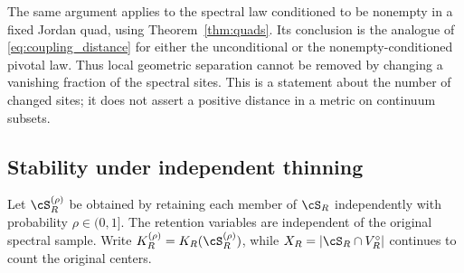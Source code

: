 The same argument applies to the spectral law conditioned to be nonempty in a fixed Jordan quad, using Theorem~\ref{thm:quads}. Its conclusion is the analogue of \eqref{eq:coupling_distance} for either the unconditional or the nonempty-conditioned pivotal law. Thus local geometric separation cannot be removed by changing a vanishing fraction of the spectral sites. This is a statement about the number of changed sites; it does not assert a positive distance in a metric on continuum subsets.

\subsection{Stability under independent thinning}\label{sec:thinning}

Let $\cS_R^{(\rho)}$ be obtained by retaining each member of $\cS_R$ independently with probability $\rho\in(0,1]$. The retention variables are independent of the original spectral sample. Write $K_R^{(\rho)}=K_R(\cS_R^{(\rho)})$, while $X_R=|\cS_R\cap V_R^\circ|$ continues to count the original centers.

